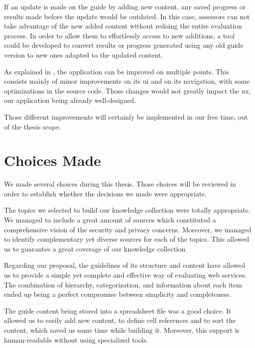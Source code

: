 If an update is made on the guide by adding new content, any saved progress or results made before the update would be outdated. In this case, assessors can not take advantage of the new added content without redoing the entire evaluation process. In order to allow them to effortlessly access to new additions, a tool could be developed to convert results or progress generated using any old guide version to new ones adapted to the updated content.

As explained in , the application can be improved on multiple points. This consists mainly of minor improvements on its \gls{ui} and on its navigation, with some optimizations in the source code. Those changes would not greatly impact the \gls{ux}, our application being already well-designed.

Those different improvements will certainly be implemented in our free time, out of the thesis scope.

\section{Choices Made}
\label{sec:conclusions_choices}

We made several choices during this thesis. Those choices will be reviewed in order to establish whether the decisions we made were appropriate.

The topics we selected to build our knowledge collection were totally appropriate. We managed to include a great amount of sources which constituted a comprehensive vision of the security and privacy concerns. Moreover, we managed to identify complementary yet diverse sources for each of the topics. This allowed us to guarantee a great coverage of our knowledge collection.

Regarding our proposal, the guidelines of its structure and content have allowed us to provide a simple yet complete and effective way of evaluating web services. The combination of hierarchy, categorization, and information about each item ended up being a perfect compromise between simplicity and completeness.

The guide content being stored into a spreadsheet file was a good choice. It allowed us to easily add new content, to define cell references and to sort the content, which saved us some time while building it. Moreover, this support is human-readable without using specialized tools.

